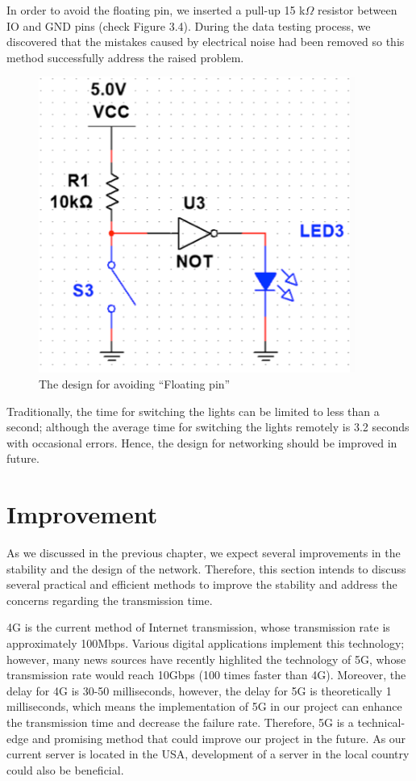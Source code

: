 \documentclass[12pt,a4paper]{report}
\begin{document}
\vspace{0.2cm}

\noindent In order to avoid the floating pin, we inserted a pull-up 15 k$\Omega$ resistor between IO and GND pins (check Figure 3.4). During the data testing process, we discovered that the mistakes caused by electrical noise had been removed so this method successfully address the raised problem. 

\begin{figure}[H]
	\centering
	\includegraphics[scale= 1]{figures/goodFP.png}
	\caption{The design for avoiding “Floating pin” }
\end{figure}

\vspace{0.2cm}
\noindent Traditionally, the time for switching the lights can be limited to less than a second; although the average time for switching the lights remotely is 3.2 seconds with occasional errors. Hence, the design for networking should be improved in future. 


\chapter{Improvement}
As we discussed in the previous chapter, we expect several improvements in the stability and the design of the network. Therefore, this section intends to discuss several practical and efficient methods to improve the stability and address the concerns regarding the transmission time. 
\vspace{0.2cm}

\noindent 4G is the current method of Internet transmission, whose transmission rate is approximately 100Mbps. Various digital applications implement this technology; however, many news sources have recently highlited the technology of 5G, whose transmission rate would reach 10Gbps (100 times faster than 4G). Moreover, the delay for 4G is 30-50 milliseconds, however, the delay for 5G is theoretically 1 milliseconds, which means the implementation of 5G in our project can enhance the transmission time and decrease the failure rate. Therefore, 5G is a technical-edge and promising method that could improve our project in the future. As our current server is located in the USA, development of a server in the local country could also be beneficial. 
\end{document}
